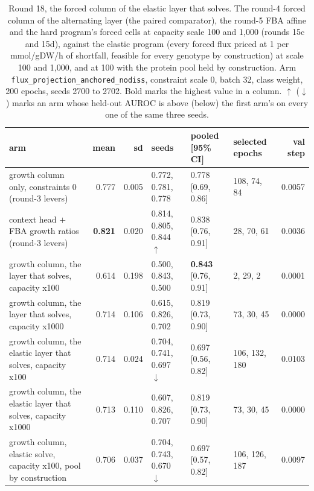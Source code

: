 \begin{table}[H]
  \centering
  \scriptsize
  \setlength{\tabcolsep}{2.5pt}
  \caption[Round 18, the forced column of the elastic layer that solves]{Round 18, the forced column of the elastic layer that solves. The round-4 forced column of the alternating layer (the paired comparator), the round-5 FBA affine and the hard program's forced cells at capacity scale 100 and 1,000 (rounds 15c and 15d), against the elastic program (every forced flux priced at 1 per mmol/gDW/h of shortfall, feasible for every genotype by construction) at scale 100 and 1,000, and at 100 with the protein pool held by construction. Arm \texttt{flux\_projection\_anchored\_nodiss}, constraint scale 0, batch 32, class weight, 200 epochs, seeds 2700 to 2702. Bold marks the highest value in a column. $\uparrow$ ($\downarrow$) marks an arm whose held-out AUROC is above (below) the first arm's on every one of the same three seeds.}
  \label{tab:w32}
  \begin{tabular}{@{}lrrlllr@{}}
    \hline
    arm & mean & sd & seeds & pooled [95\% CI] & selected epochs & val step \\
    \hline
    growth column only, constraints 0 (round-3 levers) & 0.777 & 0.005 & 0.772, 0.781, 0.778 & 0.778 [0.69, 0.86] & 108, 74, 84 & 0.0057 \\
    context head $+$ FBA growth ratios (round-3 levers) & \textbf{0.821} & 0.020 & 0.814, 0.805, 0.844 $\uparrow$ & 0.838 [0.76, 0.91] & 28, 70, 61 & 0.0036 \\
    growth column, the layer that solves, capacity x100 & 0.614 & 0.198 & 0.500, 0.843, 0.500 & \textbf{0.843} [0.76, 0.91] & 2, 29, 2 & 0.0001 \\
    growth column, the layer that solves, capacity x1000 & 0.714 & 0.106 & 0.615, 0.826, 0.702 & 0.819 [0.73, 0.90] & 73, 30, 45 & 0.0000 \\
    growth column, the elastic layer that solves, capacity x100 & 0.714 & 0.024 & 0.704, 0.741, 0.697 $\downarrow$ & 0.697 [0.56, 0.82] & 106, 132, 180 & 0.0103 \\
    growth column, the elastic layer that solves, capacity x1000 & 0.713 & 0.110 & 0.607, 0.826, 0.707 & 0.819 [0.73, 0.90] & 73, 30, 45 & 0.0000 \\
    growth column, elastic solve, capacity x100, pool by construction & 0.706 & 0.037 & 0.704, 0.743, 0.670 $\downarrow$ & 0.697 [0.57, 0.82] & 106, 126, 187 & 0.0097 \\
    \hline
  \end{tabular}
\end{table}
